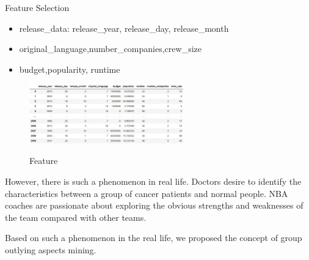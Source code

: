 \documentclass[
 size=12pt,
 paper=smartboard,  %
 mode=present, 		%
 display=slides, 	%
 style=tuliplab,  	%
 pauseslide,
 fleqn,leqno]{powerdot}
\begin{document}
\begin{slide}{Feature Selection}
  \begin{itemize}
    \item
     release_data: release_year, release_day, release_month
    \item
     original_language,number_companies,crew_size
     \item
     budget,popularity, runtime
  \end{itemize}
  \vspace{0.2cm}
  \begin{figure}[htbp]
    \centering
    \includegraphics[width=0.6\textwidth,height=0.42\textwidth]{figures/feature1.eps}\\
    \caption{Feature}
  \end{figure}
\begin{note}
However,
there is such a phenomenon in real life.
Doctors desire to identify the characteristics between
a group of cancer patients and normal people.
NBA coaches are passionate about exploring the obvious strengths and
weaknesses of the team compared with other teams.

Based on such a phenomenon in the real life,
we proposed the concept of group outlying aspects mining.
\end{note}
\end{slide}
\end{document}
